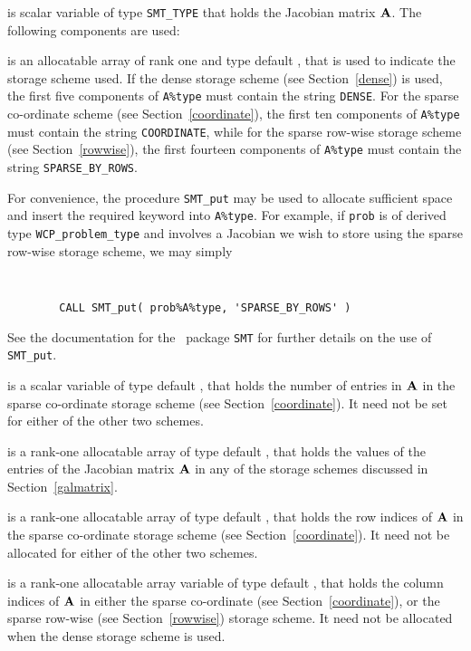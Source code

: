 \documentclass{galahad}
\newcommand{\packagename}{WCP}
\begin{document}
\begin{description}
 is scalar variable of type {\tt SMT\_TYPE} 
that holds the Jacobian matrix ${\mathbf{A}}$. The following components are used:

\begin{description}

 is an allocatable array of rank one and type default \character, that
is used to indicate the storage scheme used. If the dense storage scheme 
(see Section~\ref{dense}) is used, 
the first five components of {\tt A\%type} must contain the
string {\tt DENSE}.
For the sparse co-ordinate scheme (see Section~\ref{coordinate}), 
the first ten components of {\tt A\%type} must contain the
string {\tt COORDINATE}, while 
for the sparse row-wise storage scheme (see Section~\ref{rowwise}),
the first fourteen components of {\tt A\%type} must contain the
string {\tt SPARSE\_BY\_ROWS}.

For convenience, the procedure {\tt SMT\_put} 
may be used to allocate sufficient space and insert the required keyword
into {\tt A\%type}.
For example, if {\tt prob} is of derived type {\tt \packagename\_problem\_type}
and involves a Jacobian we wish to store using the sparse row-wise 
storage scheme, we may simply
{\tt 
\begin{verbatim}
        CALL SMT_put( prob%A%type, 'SPARSE_BY_ROWS' )
\end{verbatim}
}
\noindent
See the documentation for the \galahad\ package {\tt SMT} 
for further details on the use of {\tt SMT\_put}.

 is a scalar variable of type default \integer, that 
holds the number of entries in ${\mathbf{A}}$
in the sparse co-ordinate storage scheme (see Section~\ref{coordinate}). 
It need not be set for either of the other two schemes.

 is a rank-one allocatable array of type default \realdp, that holds
the values of the entries of the Jacobian matrix ${\mathbf{A}}$ in any of the 
storage schemes discussed in Section~\ref{galmatrix}.

 is a rank-one allocatable array of type default \integer,
that holds the row indices of ${\mathbf{A}}$ in the sparse co-ordinate storage
scheme (see Section~\ref{coordinate}). 
It need not be allocated for either of the other two schemes.

 is a rank-one allocatable array variable of type default \integer,
that holds the column indices of ${\mathbf{A}}$ in either the sparse co-ordinate 
(see Section~\ref{coordinate}), or the sparse row-wise 
(see Section~\ref{rowwise}) storage scheme.
It need not be allocated when the dense storage scheme is used.


\end{description}
\end{description}
\end{document}
